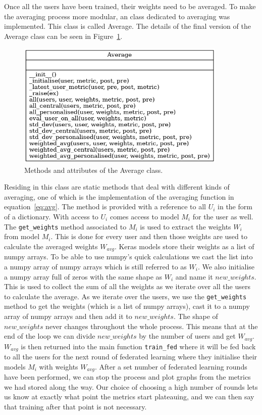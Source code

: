 \documentclass[12pt]{article}
\begin{document}
\\\\
Once all the users have been trained, their weights need to be averaged. To make the averaging process more modular, an class dedicated to averaging was implemented. This class is called Average. The details of the final version of the Average class can be seen in Figure~\ref{fig:classes_average}.
\begin{figure}[H]
	\centering
	\includegraphics[width=10cm]{resources/classes_Average.png}
	\caption{Methods and attributes of the Average class.}
	\label{fig:classes_average}
\end{figure}
\noindent Residing in this class are static methods that deal with different kinds of averaging, one of which is the implementation of the averaging function in equation~\ref{eq:avg}. The method is provided with a reference to all $U_i$ in the form of a dictionary. With access to $U_i$ comes access to model $M_i$ for the user as well. The \texttt{get\_weights} method associated to $M_i$ is used to extract the weights $W_i$ from model $M_i$. This is done for every user and then those weights are used to calculate the averaged weights $W_{avg}$. Keras models store their weights as a list of numpy arrays. To be able to use numpy's quick calculations we cast the list into a numpy array of numpy arrays which is still referred to as $W_i$. We also initialise a numpy array full of zeros with the same shape as $W_i$ and name it $new\_weights$. This is used to collect the sum of all the weights as we iterate over all the users to calculate the average. As we iterate over the users, we use the \texttt{get\_weights} method to get the weights (which is a list of numpy arrays), cast it to a numpy array of numpy arrays and then add it to $new\_weights$. The shape of $new\_weights$ never changes throughout the whole process. This means that at the end of the loop we can divide $new\_weights$ by the number of users and get $W_{avg}$. $W_{avg}$ is then returned into the main function \texttt{train\_fed} where it will be fed back to all the users for the next round of federated learning where they initialise their models $M_i$ with weights $W_{avg}$. After a set number of federated learning rounds have been performed, we can stop the process and plot graphs from the metrics we had stored along the way. Our choice of choosing a high number of rounds lets us know at exactly what point the metrics start plateauing, and we can then say that training after that point is not necessary. 
\end{document}
